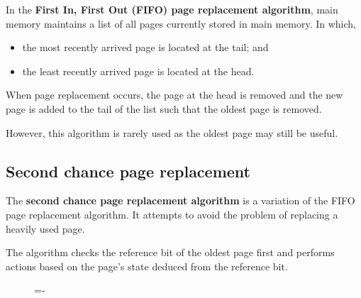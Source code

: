 \documentclass[a4paper]{systems-software}
\begin{document}
In the \textbf{First In, First Out (FIFO) page replacement algorithm}, main memory maintains a list of all pages currently stored in main memory. In which,
\begin{itemize}
	\item the most recently arrived page is located at the tail; and
	\item the least recently arrived page is located at the head.
\end{itemize}

When page replacement occurs, the page at the head is removed and the new page is added to the tail of the list such that the oldest page is removed.

However, this algorithm is rarely used as the oldest page may still be useful.


\subsection*{Second chance page replacement}

The \textbf{second chance page replacement algorithm} is a variation of the FIFO page replacement algorithm. It attempts to avoid the problem of replacing a heavily used page.

The algorithm checks the reference bit of the oldest page first and performs actions based on the page's state deduced from the reference bit.

\begin{figure}[H]
  \lineskip=-\fboxrule
\end{figure}
\end{document}
